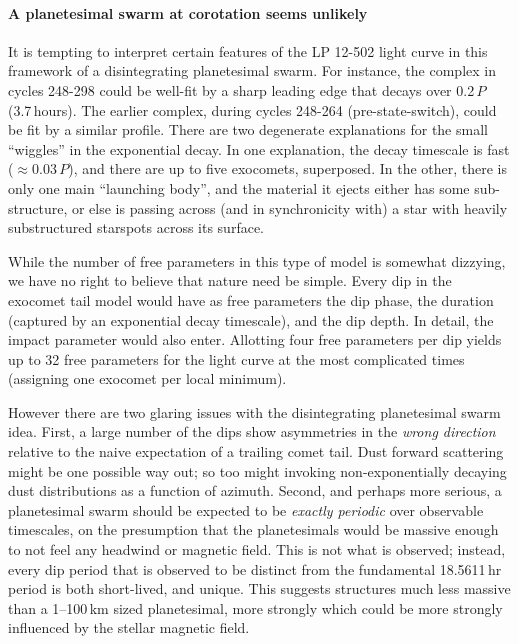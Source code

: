 \documentclass[11pt,twocolumn,tighten]{aastex63}
\begin{document}
\paragraph{A planetesimal swarm at corotation seems unlikely}
It is tempting to interpret certain features of the LP 12-502 light
curve in this framework of a disintegrating planetesimal swarm.  For
instance, the complex in cycles 248-298 could be well-fit by a sharp
leading edge that decays over 0.2\,$P$ (3.7\,hours).  The earlier
complex, during cycles 248-264 (pre-state-switch), could be fit by a
similar profile.  There are two degenerate explanations for the small
``wiggles'' in the exponential decay.  In one explanation, the decay
timescale is fast ($\approx$0.03\,$P$), and there are up to five
exocomets, superposed.  In the other, there is only one main
``launching body'', and the material it ejects either has some
sub-structure, or else is passing across (and in synchronicity with) a
star with heavily substructured starspots across its surface.

While the number of free parameters in this type of model is somewhat
dizzying, we have no right to believe that nature need be
simple.  Every dip in the exocomet tail model would have as free
parameters the dip phase, the duration (captured by an exponential
decay timescale), and the dip depth.  In detail, the impact parameter
would also enter.  Allotting four free parameters per dip yields up to
32 free parameters for the light curve at the most complicated times
(assigning one exocomet per local minimum).

However there are two glaring issues with the disintegrating planetesimal swarm idea.
First, a large number of the dips show asymmetries in the {\it wrong
	direction} relative to the naive expectation of a trailing comet tail.
Dust forward scattering might be one possible way out; so too might
invoking non-exponentially decaying dust
distributions as a function of azimuth.
Second, and perhaps more serious, a planetesimal swarm should be expected
to be {\it exactly periodic} over observable timescales, on the presumption that the planetesimals
would be massive enough to not feel any headwind or magnetic field.
This is not what is observed; instead, every dip period
that is observed to be distinct from the fundamental 18.5611\,hr period
is both short-lived, and unique.
This suggests structures much less massive than a 1--100\,km sized
planetesimal,
 more strongly
which could be more strongly influenced by the stellar magnetic field.
\end{document}
